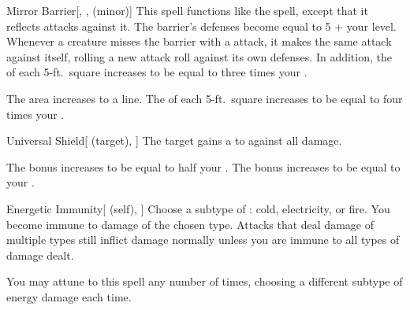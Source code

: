 \lowercase{\hypertarget{spell:Mirror Barrier}{}}\label{spell:Mirror Barrier}
\begin{freeability}[Rank 4]{\hypertarget{spell:Mirror Barrier}{Mirror Barrier}}[, ,  (minor)]
\targetrule
This spell functions like the  spell, except that it reflects  attacks against it.
The barrier's defenses become equal to 5 + your level.
Whenever a creature misses the barrier with a  attack, it makes the same attack against itself, rolling a new attack roll against its own defenses.
In addition, the  of each 5-ft.\ square increases to be equal to three times your .

 The area increases to a \arealarge line.
 The  of each 5-ft.\ square increases to be equal to four times your .
\end{freeability}
\vspace{0.25em}



\lowercase{\hypertarget{spell:Universal Shield}{}}\label{spell:Universal Shield}
\begin{attuneability}[Rank 4]{\hypertarget{spell:Universal Shield}{Universal Shield}}[ (target), ]
The target gains a   to  against all damage.

\rankline
{} The bonus increases to be equal to half your .
 The bonus increases to be equal to your .
\end{attuneability}
\vspace{0.25em}



\lowercase{\hypertarget{spell:Energetic Immunity}{}}\label{spell:Energetic Immunity}
\begin{attuneability}[Rank 5]{\hypertarget{spell:Energetic Immunity}{Energetic Immunity}}[ (self), ]
Choose a subtype of : cold, electricity, or fire.
You become immune to damage of the chosen type.
Attacks that deal damage of multiple types still inflict damage normally unless you are immune to all types of damage dealt.

\rankline
{} You may attune to this spell any number of times, choosing a different subtype of energy damage each time.
\end{attuneability}
\vspace{0.25em}



